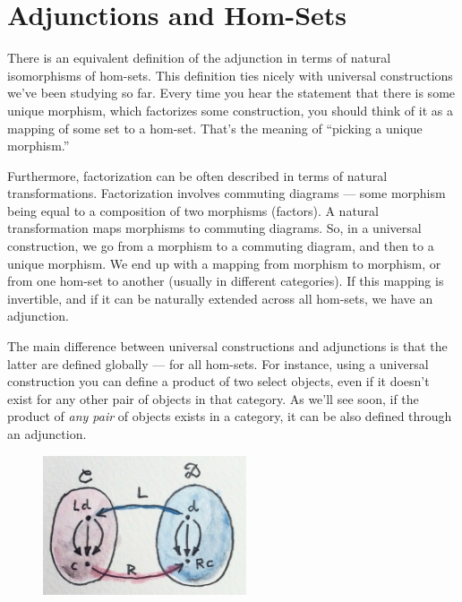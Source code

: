 \section{Adjunctions and Hom-Sets}

There is an equivalent definition of the adjunction in terms of natural
isomorphisms of hom-sets. This definition ties nicely with universal
constructions we've been studying so far. Every time you hear the
statement that there is some unique morphism, which factorizes some
construction, you should think of it as a mapping of some set to a
hom-set. That's the meaning of ``picking a unique morphism.''

Furthermore, factorization can be often described in terms of natural
transformations. Factorization involves commuting diagrams --- some
morphism being equal to a composition of two morphisms (factors). A
natural transformation maps morphisms to commuting diagrams. So, in a
universal construction, we go from a morphism to a commuting diagram,
and then to a unique morphism. We end up with a mapping from morphism to
morphism, or from one hom-set to another (usually in different
categories). If this mapping is invertible, and if it can be naturally
extended across all hom-sets, we have an adjunction.

The main difference between universal constructions and adjunctions is
that the latter are defined globally --- for all hom-sets. For instance,
using a universal construction you can define a product of two select
objects, even if it doesn't exist for any other pair of objects in that
category. As we'll see soon, if the product of \emph{any pair} of
objects exists in a category, it can be also defined through an
adjunction.

\begin{figure}[H]
\centering
\includegraphics[width=60mm]{images/adj-homsets.jpg}
\end{figure}


